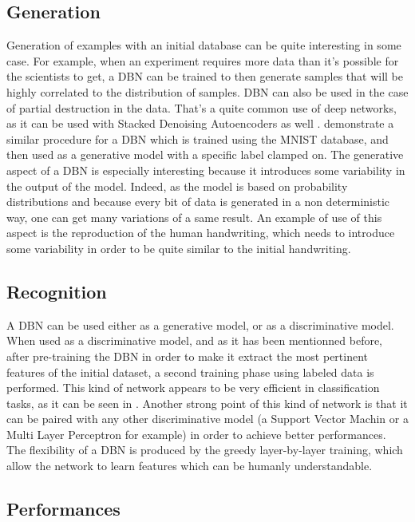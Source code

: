 \documentclass{report}
\begin{document}
	\subsection{Generation}
	
	Generation of examples with an initial database can be quite interesting in 
	some case. For example, when an experiment requires more data than it's 
	possible for the scientists to get, a DBN can be trained to then generate 
	samples that will be highly correlated to the distribution of samples. DBN can 
	also be used in the case of partial destruction in the data. That's a quite 
	common use of deep networks, as it can be used with Stacked Denoising 
	Autoencoders as well \cite{vincent2010stacked}. 
	\cite{hinton2006fast} demonstrate a similar procedure for a DBN 
	which is trained using the MNIST database, and then used as a generative model 
	with a specific label clamped on. The generative aspect of a DBN is especially 
	interesting because it introduces some variability in the output of the model. 
	Indeed, as the model is based on probability distributions and because every 
	bit of data is generated in a non deterministic way, one can get many 
	variations of a same result. An example of use of this aspect is the 
	reproduction of the human handwriting, which needs to introduce some 
	variability in order to be quite similar to the initial handwriting. 

	\subsection{Recognition}
	
	A DBN can be used either as a generative model, or as a discriminative model. 
	When used as a discriminative model, and as it has been mentionned before, 
	after pre-training the DBN in order to make it extract the most pertinent 
	features of the initial dataset, a second training phase using labeled data is 
	performed. This kind of network appears to be very efficient in classification 
	tasks, as it can be seen in \cite{hinton2006fast}. Another strong 
	point of this kind of network is that it can be paired with any other 
	discriminative model (a Support Vector Machin or a Multi Layer Perceptron for 
	example) in order to achieve better performances. The flexibility of a DBN is 
	produced by the greedy layer-by-layer training, which allow the network to 
	learn features which can be humanly understandable.
	
	\subsection{Performances}
	
\end{document}
